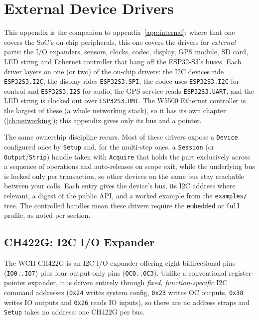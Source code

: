 \chapter{External Device Drivers}
\label{app:external}

This appendix is the companion to appendix~\ref{app:internal}: where that one
covers the SoC's on-chip peripherals, this one covers the drivers for
\emph{external} parts: the I/O expanders, sensors, clocks, codec, display,
GPS module, SD card, LED string and Ethernet controller that hang off the
ESP32-S3's buses. Each driver layers on one (or two) of the on-chip drivers: the
I2C devices ride \texttt{ESP32S3.I2C}, the display rides \texttt{ESP32S3.SPI}, the
codec uses \texttt{ESP32S3.I2C} for control and \texttt{ESP32S3.I2S} for audio, the
GPS service reads \texttt{ESP32S3.UART}, and the LED string is clocked out over
\texttt{ESP32S3.RMT}. The W5500 Ethernet controller is the largest of these (a
whole networking stack), so it has its own chapter
(\ref{ch:networking}); this appendix gives only its bus and a pointer.

The same ownership discipline recurs. Most of these drivers expose a
\texttt{Device} configured once by \texttt{Setup} and, for the multi-step ones, a
\texttt{Session} (or \texttt{Output}/\texttt{Strip}) handle taken with
\texttt{Acquire} that holds the part exclusively across a sequence of operations
and auto-releases on scope exit, while the underlying bus is locked only per
transaction, so other devices on the same bus stay reachable between your
calls. Each entry gives the device's bus, its I2C address where relevant, a digest
of the public API, and a worked example from the \texttt{examples/} tree. The
controlled handles mean these drivers require the \texttt{embedded} or
\texttt{full} profile, as noted per section.

\section{CH422G: I2C I/O Expander}
\label{app:ext:ch422g}

The WCH CH422G is an I2C I/O expander offering eight bidirectional pins
(\texttt{IO0..IO7}) plus four output-only pins (\texttt{OC0..OC3}). Unlike a
conventional register-pointer expander, it is driven entirely through \emph{fixed,
function-specific} I2C command addresses (\texttt{0x24} writes system config,
\texttt{0x23} writes OC outputs, \texttt{0x38} writes IO outputs and \texttt{0x26}
reads IO inputs), so there are no address straps and \texttt{Setup} takes no
address: one CH422G per bus.

